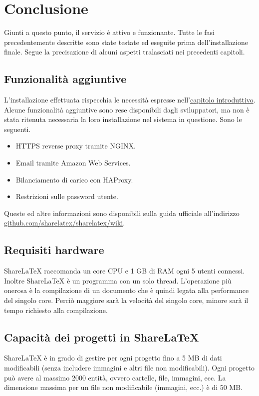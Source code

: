 \chapter{Conclusione}
\label{Conclusione}
\thispagestyle{empty}

Giunti a questo punto, il servizio è attivo e funzionante. Tutte le fasi precedentemente descritte sono state testate ed eseguite prima dell'installazione finale. Segue la precisazione di alcuni aspetti tralasciati nei precedenti capitoli.

\section{Funzionalità aggiuntive}
L'installazione effettuata rispecchia le necessità espresse nell'\hyperref[Introduzione]{capitolo introduttivo}. Alcune funzionalità aggiuntive sono rese disponibili dagli sviluppatori, ma non è stata ritenuta necessaria la loro installazione nel sistema in questione. Sono le seguenti.
\begin{itemize}
    \item HTTPS reverse proxy tramite NGINX.
    \item Email tramite Amazon Web Services.
    \item Bilanciamento di carico con HAProxy.
    \item Restrizioni sulle password utente.
\end{itemize}
Queste ed altre informazioni sono disponibili sulla guida ufficiale all'indirizzo \url{github.com/sharelatex/sharelatex/wiki}.

\section{Requisiti hardware}
ShareLaTeX raccomanda un core CPU e 1 GB di RAM ogni 5 utenti connessi. Inoltre ShareLaTeX è un programma con un solo thread. L'operazione più onerosa è la compilazione di un documento che è quindi legata alla performance del singolo core. Perciò maggiore sarà la velocità del singolo core, minore sarà il tempo richiesto alla compilazione.

\section{Capacità dei progetti in ShareLaTeX}
ShareLaTeX è in grado di gestire per ogni progetto fino a 5 MB di dati modificabili (senza includere immagini e altri file non modificabili). Ogni progetto può avere al massimo 2000 entità, ovvero cartelle, file, immagini, ecc. La dimensione massima per un file non modificabile (immagini, ecc.) è di 50 MB.